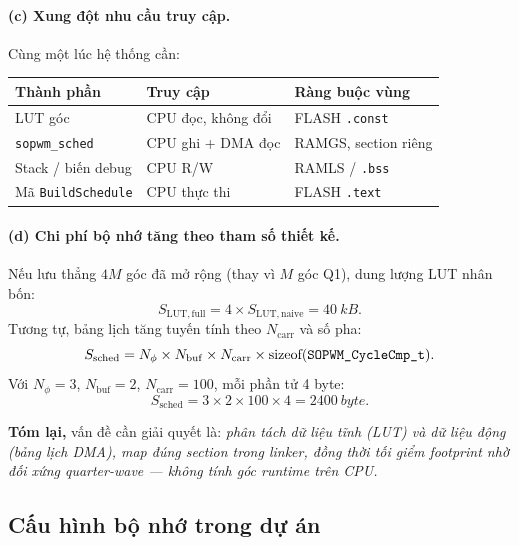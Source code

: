 \paragraph{(c) Xung đột nhu cầu truy cập.}
Cùng một lúc hệ thống cần:
\begin{center}
\begin{tabular}{@{}lll@{}}
  \toprule
  Thành phần & Truy cập & Ràng buộc vùng \\
  \midrule
  LUT góc & CPU đọc, không đổi & FLASH \texttt{.const} \\
  \texttt{sopwm\_sched} & CPU ghi + DMA đọc & RAMGS, section riêng \\
  Stack / biến debug & CPU R/W & RAMLS / \texttt{.bss} \\
  Mã \texttt{BuildSchedule} & CPU thực thi & FLASH \texttt{.text} \\
  \bottomrule
\end{tabular}
\end{center}

\paragraph{(d) Chi phí bộ nhớ tăng theo tham số thiết kế.}
Nếu lưu thẳng $4M$ góc đã mở rộng (thay vì $M$ góc Q1), dung lượng LUT nhân bốn:
\begin{equation}
  S_{\mathrm{LUT,full}} = 4 \times S_{\mathrm{LUT,naive}} = \SI{40}{kB}.
\end{equation}
Tương tự, bảng lịch tăng tuyến tính theo $N_{\mathrm{carr}}$ và số pha:
\begin{equation}
  S_{\mathrm{sched}} = N_{\phi} \times N_{\mathrm{buf}} \times N_{\mathrm{carr}} \times \text{sizeof}(\texttt{SOPWM\_CycleCmp\_t}).
  \label{eq:sched_size}
\end{equation}
Với $N_{\phi}=3$, $N_{\mathrm{buf}}=2$, $N_{\mathrm{carr}}=100$, mỗi phần tử 4 byte:
\begin{equation}
  S_{\mathrm{sched}} = 3 \times 2 \times 100 \times 4 = \SI{2400}{byte}.
  \label{eq:sched_2400}
\end{equation}

\noindent\textbf{Tóm lại,} vấn đề cần giải quyết là: \emph{phân tách dữ liệu tĩnh (LUT) và dữ liệu động (bảng lịch DMA), map đúng section trong linker, đồng thời tối giểm footprint nhờ đối xứng quarter-wave --- không tính góc runtime trên CPU.}

\subsection{Cấu hình bộ nhớ trong dự án}

